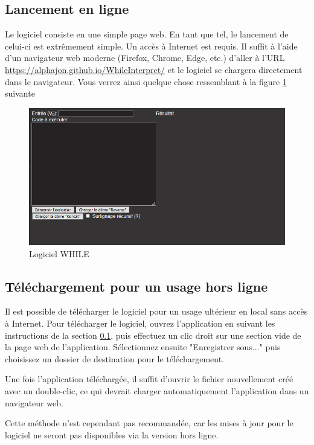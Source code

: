 \documentclass{article}
\begin{document}
\subsection{Lancement en ligne}
\label{sec:lancement}
Le logiciel consiste en une simple page web. En tant que tel, le lancement de celui-ci est extrêmement simple. Un accès à Internet est requis. Il suffit à l'aide d'un navigateur web moderne (Firefox, Chrome, Edge, etc.) d'aller à l'URL \url{https://alphajon.github.io/WhileInterpret/} et le logiciel se chargera directement dans le navigateur. Vous verrez ainsi quelque chose ressemblant à la figure \ref{fig:cap1} suivante

\begin{figure}[h]
\includegraphics[width=\textwidth]{img/Capture1.PNG}
\caption{Logiciel WHILE}
\label{fig:cap1}
\end{figure}

\subsection{Téléchargement pour un usage hors ligne}

Il est possible de télécharger le logiciel pour un usage ultérieur en local sans accès à Internet. Pour télécharger le logiciel, ouvrez l'application en suivant les instructions de la section \ref{sec:lancement}, puis effectuez un clic droit sur une section vide de la page web de l'application. Sélectionnez ensuite "Enregistrer sous..." puis choisissez un dossier de destination pour le téléchargement.

Une fois l'application téléchargée, il suffit d'ouvrir le fichier nouvellement créé avec un double-clic, ce qui devrait charger automatiquement l'application dans un navigateur web.

Cette méthode n'est cependant pas recommandée, car les mises à jour pour le logiciel ne seront pas disponibles via la version hors ligne.
\end{document}
